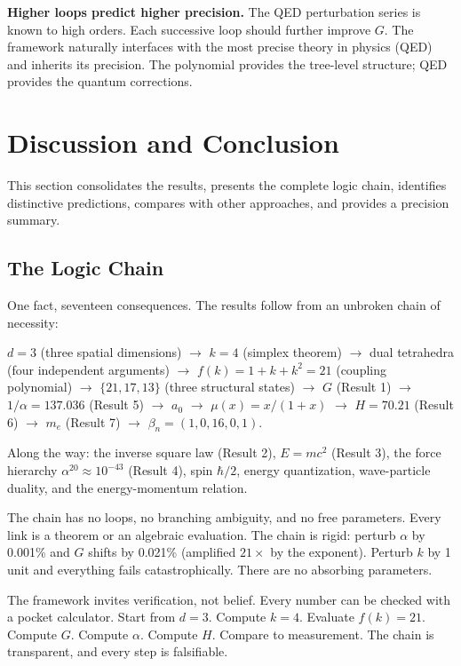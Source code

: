 \documentclass[aps,prd,preprint,superscriptaddress,showpacs,preprintnumbers,amsmath,amssymb,nofootinbib]{revtex4-2}
\begin{document}
\textbf{Higher loops predict higher precision.} The QED perturbation series is known to high orders. Each successive loop should further improve $G$. The framework naturally interfaces with the most precise theory in physics (QED) and inherits its precision. The polynomial provides the tree-level structure; QED provides the quantum corrections.

\section{Discussion and Conclusion}
\label{sec:conclusion}

This section consolidates the results, presents the complete logic chain, identifies distinctive predictions, compares with other approaches, and provides a precision summary.

\subsection{The Logic Chain}
\label{subsec:chain}

One fact, seventeen consequences. The results follow from an unbroken chain of necessity:

$d = 3$ (three spatial dimensions) $\to$ $k = 4$ (simplex theorem) $\to$ dual tetrahedra (four independent arguments) $\to$ $f(k) = 1 + k + k^2 = 21$ (coupling polynomial) $\to$ $\{21, 17, 13\}$ (three structural states) $\to$ $G$ (Result 1) $\to$ $1/\alpha = 137.036$ (Result 5) $\to$ $a_0$ $\to$ $\mu(x) = x/(1+x)$ $\to$ $H = 70.21$ (Result 6) $\to$ $m_e$ (Result 7) $\to$ $\beta_n = (1, 0, 16, 0, 1)$.

Along the way: the inverse square law (Result 2), $E = mc^2$ (Result 3), the force hierarchy $\alpha^{20} \approx 10^{-43}$ (Result 4), spin $\hbar/2$, energy quantization, wave-particle duality, and the energy-momentum relation.

The chain has no loops, no branching ambiguity, and no free parameters. Every link is a theorem or an algebraic evaluation. The chain is rigid: perturb $\alpha$ by 0.001\% and $G$ shifts by 0.021\% (amplified $21\times$ by the exponent). Perturb $k$ by 1 unit and everything fails catastrophically. There are no absorbing parameters.

The framework invites verification, not belief. Every number can be checked with a pocket calculator. Start from $d = 3$. Compute $k = 4$. Evaluate $f(k) = 21$. Compute $G$. Compute $\alpha$. Compute $H$. Compare to measurement. The chain is transparent, and every step is falsifiable.
\end{document}
